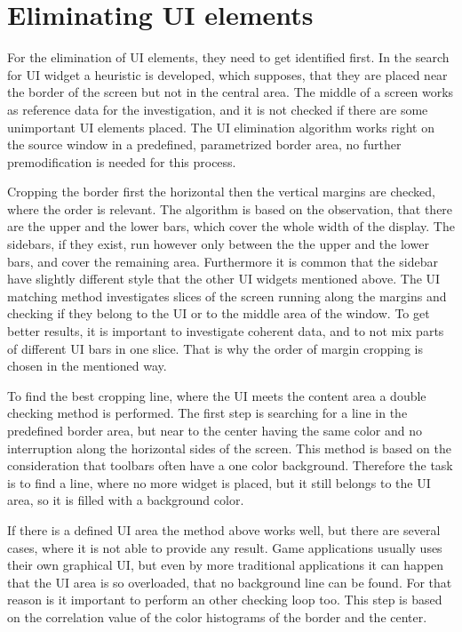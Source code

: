 \documentclass[draft,final]{vutinfth} %
\begin{document}
\section{Eliminating UI elements}
For the elimination of UI elements, they need to get identified first.
In the search for UI widget a heuristic is developed, which supposes, that they are placed near the border of the screen but not in the central area.
The middle of a screen works as reference data for the investigation, and it is not checked if there are some unimportant UI elements placed.
The UI elimination algorithm works right on the source window in a predefined, parametrized border area, no further premodification is needed for this process.\par
Cropping the border first the horizontal then the vertical margins are checked, where the order is relevant.
The algorithm is based on the observation, that there are the upper and the lower bars, which cover the whole width of the display.
The sidebars, if they exist, run however only between the the upper and the lower bars, and cover the remaining area.
Furthermore it is common that the sidebar have slightly different style that the other UI widgets mentioned above.
The UI matching method investigates slices of the screen running along the margins and checking if they belong to the UI or to the middle area of the window.
To get better results, it is important to investigate coherent data, and to not mix parts of different UI bars in one slice.
That is why the order of margin cropping is chosen in the mentioned way.\par 
To find the best cropping line, where the UI meets the content area a double checking method is performed.
The first step is searching for a line in the predefined border area, but near to the center having the same color and no interruption along the horizontal sides of the screen.
This method is based on the consideration that toolbars often have a one color background.
Therefore the task is to find a line, where no more widget is placed, but it still belongs to the UI area, so it is filled with a background color.\par
If there is a defined UI area the method above works well, but there are several cases, where it is not able to provide any result.
Game applications usually uses their own graphical UI, but even by more traditional applications it can happen that the UI area is so overloaded, that no background line can be found.
For that reason is it important to perform an other checking loop too.
This step is based on the correlation value of the color histograms of the border and the center.
\end{document}
